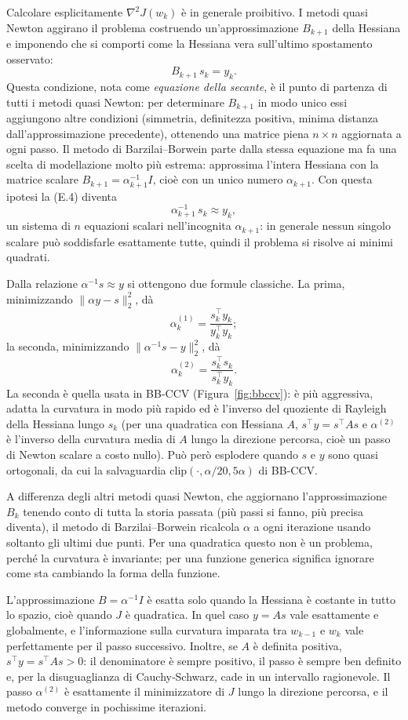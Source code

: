 \documentclass[italian, a4paper, twoside, binding=6mm]{sapthesis}
\begin{document}
Calcolare esplicitamente
$\nabla^2 J(w_k)$ è in generale proibitivo. I metodi quasi Newton aggirano il
problema costruendo un'approssimazione $B_{k+1}$ della Hessiana e imponendo
che si comporti come la Hessiana vera sull'ultimo spostamento osservato:
\[
B_{k+1}\, s_k = y_k. \tag{E.4}
\]
Questa condizione, nota come \emph{equazione della secante}, è il punto di
partenza di tutti i metodi quasi Newton: per determinare $B_{k+1}$ in modo
unico essi aggiungono altre condizioni (simmetria, definitezza positiva,
minima distanza dall'approssimazione precedente), ottenendo una matrice piena
$n \times n$ aggiornata a ogni passo. Il metodo di Barzilai--Borwein parte
dalla stessa equazione ma fa una scelta di modellazione molto più estrema:
approssima l'intera Hessiana con la matrice scalare
$B_{k+1} = \alpha_{k+1}^{-1} I$, cioè con un unico numero $\alpha_{k+1}$. Con
questa ipotesi la (E.4) diventa
\[
\alpha_{k+1}^{-1}\, s_k \approx y_k,
\]
un sistema di $n$ equazioni scalari nell'incognita $\alpha_{k+1}$: in
generale nessun singolo scalare può soddisfarle esattamente tutte, quindi il
problema si risolve ai minimi quadrati.

Dalla relazione
$\alpha^{-1} s \approx y$ si ottengono due formule classiche. La prima,
minimizzando $\|\alpha y - s\|_2^2$, dà
\[
\alpha_k^{(1)} = \frac{s_k^\top y_k}{y_k^\top y_k}; \tag{E.5}
\]
la seconda, minimizzando $\|\alpha^{-1} s - y\|_2^2$, dà
\[
\alpha_k^{(2)} = \frac{s_k^\top s_k}{s_k^\top y_k}. \tag{E.6}
\]
La seconda è quella usata in BB-CCV (Figura~\ref{fig:bbccv}): è più
aggressiva, adatta la curvatura in modo più rapido ed è l'inverso del
quoziente di Rayleigh della Hessiana lungo $s_k$ (per una quadratica con
Hessiana $A$, $s^\top y = s^\top A s$ e $\alpha^{(2)}$ è l'inverso della
curvatura media di $A$ lungo la direzione percorsa, cioè un passo di Newton
scalare a costo nullo). Può però esplodere quando $s$ e $y$ sono quasi
ortogonali, da cui la salvaguardia $\mathrm{clip}(\cdot, \alpha/20, 5\alpha)$
di BB-CCV.

A differenza degli altri metodi
quasi Newton, che aggiornano l'approssimazione $B_k$ tenendo conto di tutta
la storia passata (più passi si fanno, più precisa diventa), il metodo di
Barzilai--Borwein ricalcola $\alpha$ a ogni iterazione usando soltanto gli
ultimi due punti. Per una quadratica questo non è un problema, perché la
curvatura è invariante; per una funzione generica significa ignorare come sta
cambiando la forma della funzione.

L'approssimazione
$B = \alpha^{-1} I$ è esatta solo quando la Hessiana è costante in tutto lo
spazio, cioè quando $J$ è quadratica. In quel caso $y = A s$ vale esattamente
e globalmente, e l'informazione sulla curvatura imparata tra $w_{k-1}$ e
$w_k$ vale perfettamente per il passo successivo. Inoltre, se $A$ è definita
positiva, $s^\top y = s^\top A s > 0$: il denominatore è sempre positivo, il
passo è sempre ben definito e, per la disuguaglianza di Cauchy‑Schwarz, cade
in un intervallo ragionevole. Il passo $\alpha^{(2)}$ è esattamente il
minimizzatore di $J$ lungo la direzione percorsa, e il metodo converge in
pochissime iterazioni.
\end{document}
